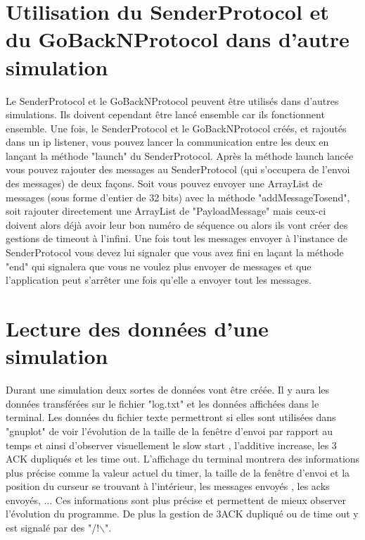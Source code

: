 \documentclass[a4paper,10pt]{article}
\begin{document}
\section{Utilisation du SenderProtocol et du GoBackNProtocol dans d'autre simulation}
Le SenderProtocol et le GoBackNProtocol peuvent être utilisés dans d'autres simulations. Ils doivent cependant être lancé ensemble car ils fonctionnent ensemble. Une fois, le SenderProtocol et le GoBackNProtocol créés, et rajoutés dans un ip listener, vous pouvez lancer la communication entre les deux en lançant la méthode "launch" du SenderProtocol. Après la méthode launch lancée vous pouvez rajouter des messages au SenderProtocol (qui s'occupera de l'envoi des messages) de deux façons. Soit vous pouvez envoyer  une ArrayList de messages (sous forme d'entier de 32 bits) avec la méthode "addMessageTosend", soit rajouter directement une ArrayList de "PayloadMessage" mais ceux-ci doivent alors déjà avoir leur bon numéro de séquence ou alors ils vont créer des gestions de timeout à l'infini. Une fois tout les messages envoyer à l'instance de SenderProtocol vous devez lui signaler que vous avez fini en laçant la méthode "end" qui signalera que vous ne voulez plus envoyer de messages et que l'application peut s'arrêter une fois qu'elle a envoyer tout les messages.\\

\section{Lecture des données d'une simulation}
Durant une simulation deux sortes de données vont être créée. Il y aura les données transférées sur le fichier "log.txt" et les données affichées dans le terminal. Les données du fichier texte permettront si elles sont utilisées dans "gnuplot" de voir l'évolution de la taille de la fenêtre d'envoi par rapport au temps et ainsi d'observer visuellement le slow start , l'additive increase, les 3 ACK dupliqués et les time out. L'affichage du terminal montrera des informations plus précise comme la valeur actuel du timer, la taille de la fenêtre d'envoi et la position du curseur se trouvant à l'intérieur, les messages envoyés , les acks envoyés, ... Ces informations sont plus précise et permettent de mieux observer l'évolution du programme. De plus la gestion de 3ACK dupliqué ou de time out y est signalé par des "/!$\backslash$".\\
\end{document}
